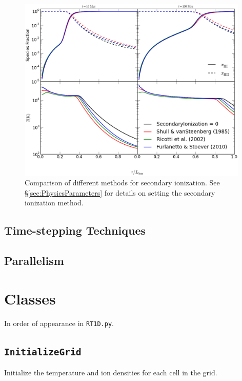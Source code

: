 \documentclass[letterpaper,titlepage,12pt]{article}
\numberwithin{equation}{section}
\begin{document}
\begin{figure}[htbp!]
\begin{center}
\includegraphics[width=0.98\textwidth]{figures/secondary_ionization_methods.eps}
\caption{Comparison of different methods for secondary ionization.  See \S\ref{sec:PhysicsParameters} for details on setting the secondary ionization method.}
\label{fig:SecondaryIonizationMethods}
\end{center}
\end{figure}

\subsection{Time-stepping Techniques}



\subsection{Parallelism}

\section{Classes}
In order of appearance in \texttt{RT1D.py}.

\subsection{\texttt{InitializeGrid}}
Initialize the temperature and ion densities for each cell in the grid.
\end{document}
